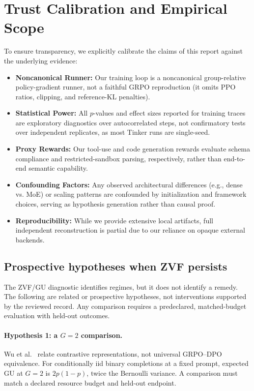 \section*{Trust Calibration and Empirical Scope}
To ensure transparency, we explicitly calibrate the claims of this report against the underlying evidence:
\begin{itemize}
    \item \textbf{Noncanonical Runner:} Our training loop is a noncanonical group-relative policy-gradient runner, not a faithful GRPO reproduction (it omits PPO ratios, clipping, and reference-KL penalties).
    \item \textbf{Statistical Power:} All $p$-values and effect sizes reported for training traces are exploratory diagnostics over autocorrelated steps, not confirmatory tests over independent replicates, as most Tinker runs are single-seed.
    \item \textbf{Proxy Rewards:} Our tool-use and code generation rewards evaluate schema compliance and restricted-sandbox parsing, respectively, rather than end-to-end semantic capability.
    \item \textbf{Confounding Factors:} Any observed architectural differences (e.g., dense vs. MoE) or scaling patterns are confounded by initialization and framework choices, serving as hypothesis generation rather than causal proof.
    \item \textbf{Reproducibility:} While we provide extensive local artifacts, full independent reconstruction is partial due to our reliance on opaque external backends.
\end{itemize}

\subsection{Prospective hypotheses when ZVF persists}
\label{sec:zvf_intervention}

The ZVF/GU diagnostic identifies regimes, but it does not identify a remedy.
The following are related or prospective hypotheses, not interventions supported
by the reviewed record. Any comparison requires a predeclared, matched-budget
evaluation with held-out outcomes.

\paragraph{Hypothesis 1: a $G=2$ comparison.}
Wu et al.~\citep{wu2025grpodpo} relate contrastive representations, not universal
GRPO--DPO equivalence. For conditionally iid binary completions at a fixed
prompt, expected GU at $G=2$ is $2p(1-p)$, twice the Bernoulli variance.
A comparison must match a declared resource budget and held-out endpoint.

